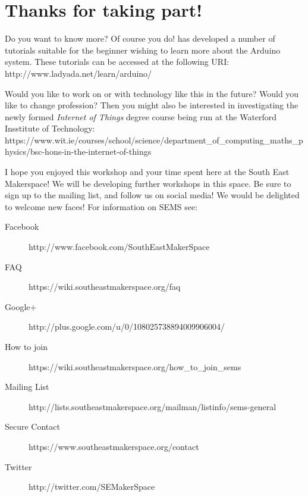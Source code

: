 \newpage
\chapter*{Thanks for taking part!}

Do you want to know more? Of course you do! \citet{fried-12} has developed a number of tutorials suitable for the beginner wishing to learn more about the \gls{Arduino} system. These tutorials can be accessed at the following URI: http://www.ladyada.net/learn/arduino/

Would you like to work on or with technology like this in the future? Would you like to change profession? Then you might also be interested in investigating the newly formed \textit{Internet of Things} degree course being run at the Waterford Insstitute of Technology: https://www.wit.ie/courses/school/science/department\_of\_computing\_maths\_physics/bsc-hons-in-the-internet-of-things

I hope you enjoyed this workshop and your time spent here at the South East Makerspace! We will be developing further workshops in this space. Be sure to sign up to the mailing list, and follow us on social media!  We would be delighted to welcome new faces! For information on SEMS see:

\begin{description}
	\item[Facebook] http://www.facebook.com/SouthEastMakerSpace
	\item[FAQ] https://wiki.southeastmakerspace.org/faq
	\item[Google+] http://plus.google.com/u/0/108025738894009906004/
	\item[How to join] https://wiki.southeastmakerspace.org/how\_to\_join\_sems
	\item[Mailing List] http://lists.southeastmakerspace.org/mailman/listinfo/sems-general
	\item[Secure Contact] https://www.southeastmakerspace.org/contact
	\item[Twitter] http://twitter.com/SEMakerSpace
\end{description} 




